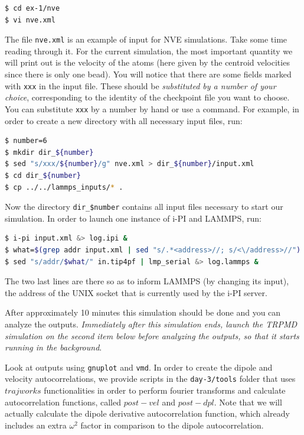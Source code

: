\documentclass{article}
\begin{document}
\begin{Exercise}[label={realtime},title={Velocity and dipole real time correlation functions}]
\begin{itemize}
\begin{lstlisting}[language=Bash,emph={\$}]
$ cd ex-1/nve
$ vi nve.xml
\end{lstlisting}

   The file \texttt{nve.xml} is an example of input for NVE simulations. Take some time reading through it. For the current simulation, the most important quantity we will print out is the velocity of the atoms (here given by the centroid velocities since there is only one bead). You will notice that there are some fields marked with \texttt{xxx} in the input file. These should be {\it substituted by a number of your choice}, corresponding to the identity of the checkpoint file you want to choose. You can substitute \texttt{xxx} by a number  by hand or use a command. For example, in order to create a new directory with all necessary input files, run:

\begin{lstlisting}[language=Bash,emph={\$}]
$ number=6
$ mkdir dir_${number} 
$ sed "s/xxx/${number}/g" nve.xml > dir_${number}/input.xml
$ cd dir_${number}
$ cp ../../lammps_inputs/* .

\end{lstlisting}

Now the directory \texttt{dir\_\$number} contains all input files necessary to start our simulation. In order to launch one instance of i-PI and LAMMPS, run:

\begin{lstlisting}[language=Bash,emph={\$}]
$ i-pi input.xml &> log.ipi &
$ what=$(grep addr input.xml | sed "s/.*<address>//; s/<\/address>//")
$ sed "s/addr/$what/" in.tip4pf | lmp_serial &> log.lammps &

\end{lstlisting}

The two last lines are there so as to inform LAMMPS (by changing its input), the address of the UNIX socket that is currently used by the i-PI server.

After approximately 10 minutes this simulation should be done and you can analyze the outputs. {\it Immediately after this simulation ends, launch the TRPMD simulation on the second item below before analyzing the outputs, so that it starts running in the background}.

Look at outputs using \texttt{gnuplot} and \texttt{vmd}. In order to create the dipole and velocity autocorrelations, we provide scripts in the \texttt{day-3/tools} folder that uses \lstinbash$trajworks$
functionalities in order to perform fourier transforms and calculate autocorrelation functions, called \lstinbash$post-vel$ and \lstinbash$post-dpl$.
Note that we will actually calculate the dipole derivative autocorrelation function, which already includes an extra $\omega^2$ factor in comparison to the dipole autocorrelation. 


\end{itemize}
\end{Exercise}
\end{document}
